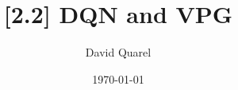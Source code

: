 \providecommand{\HANDOUT}{1}


\newcommand{\R}{\mathcal{R}}
\renewcommand{\S}{\mathcal{S}}
\newcommand{\A}{\mathcal{A}}
\renewcommand{\Pr}{\text{Pr}}
\renewcommand{\P}{\text{P}}
\newcommand{\iter}{\xrightarrow{I}}
\newcommand{\eval}{\xrightarrow{E}}
\newcommand{\iver}[1]{\llbracket {#1} \rrbracket}
\newcommand{\biject}{\langle \cdot \rangle}
\newcommand{\bij}[1]{\langle {#1} \rangle}
\newcommand{\pth}{{\boldsymbol{\phi}}}
\newcommand{\eps}{\epsilon}
\newcommand{\eplen}{T}
\newcommand{\env}{\mu}
\algnewcommand{}
\algnewcommand\Input{\item[\algorithmicinput]}
\algnewcommand{}
\algnewcommand\Output{\item[\algorithmicoutput]}
\algnewcommand{}
\algnewcommand\Effect{\item[\algorithmiceffect]}



\title[{[2.2] DQN and VPG}]
{{[2.2] DQN and VPG}}

 
\author[David Quarel] %
{David Quarel}
 
 
\date[\today] %
{\today}
 
\frame{\titlepage}


